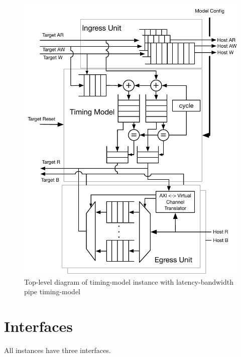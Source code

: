 \begin{figure}
	\centering
	\includegraphics[width=\columnwidth]{figures/memory-model-block-diagram.pdf}
	\caption{Top-level diagram of timing-model instance with latency-bandwidth pipe timing-model}
	\label{fig:timing_model}
\end{figure}

\section{Interfaces}\label{sec:interfaces}

All instances have three interfaces.

